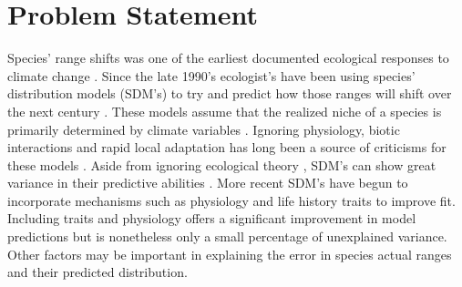 \documentclass[pdftex,11pt,a4paper]{article}\usepackage{graphicx, color}
\begin{document}
\pagebreak[4]

\section*{Problem Statement}
Species' range shifts was one of the earliest documented ecological responses to climate change \citep{Parmesan1996,Parmesan1999,Parmesan2003}.  Since the late 1990's ecologist's have been using species' distribution models (SDM's) to try and predict how those ranges will shift over the next century \citep{Davis1998,Iverson1998,Guisan2000,Peterson2001}.  These models assume that the realized niche of a species is primarily determined by climate variables \citep{Austin2002,Dormann2007}.   Ignoring physiology,  biotic interactions and rapid local adaptation has long been a source of criticisms for these models \citep{Davis1998,Pearson2003,Guisan2005,Helmuth2005}.  Aside from ignoring ecological theory \citep{Elith2009}, SDM's can show great variance in their predictive abilities \citep{Elith2006,Kearney2009,Elith2010}.  More recent SDM's have begun to incorporate mechanisms such as physiology \citep{Crozier2006,Buckley2010,Buckley2011} and  life history traits \citep{Midgley2006,Kearney2009,Poyry2009,Angert2011a} to improve fit. Including traits and physiology offers a significant improvement in model predictions \citep{Angert2011a,Buckley2011} but is nonetheless only a small percentage of unexplained variance.  Other factors may be important in explaining the error in species actual ranges and their predicted distribution. \\ 
\end{document}
